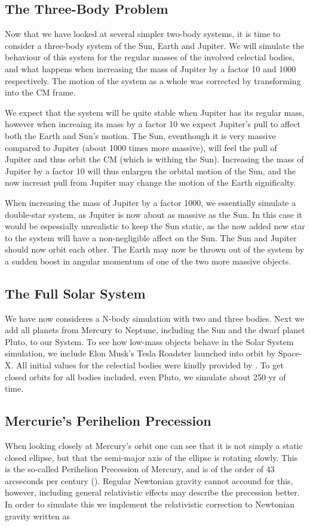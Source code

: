 \documentclass[twocolumn]{aastex62}
\begin{document}
\subsection{The Three-Body Problem} \label{subsec:three_body_prob}
Now that we have looked at several simpler two-body systems, it is time to
consider a three-body system of the Sun, Earth and Jupiter. We will simulate the
behaviour of this system for the regular masses of the involved celectial
bodies, and what happens when increasing the mass of Jupiter by a factor 10 and
1000 respectively. The motion of the system as a whole was corrected by
transforming into the CM frame.

We expect that the system will be quite stable when Jupiter has its regular
mass, however when increaing its mass by a factor 10 we expect Jupiter's pull to
affect both the Earth and Sun's motion. The Sun, eventhough it is very massive
compared to Jupiter (about 1000 times more massive), will feel the pull of
Jupiter and thus orbit the CM (which is withing the Sun). Increasing the mass of
Jupiter by a factor 10 will thus enlargen the orbital motion of the Sun, and the
now increast pull from Jupiter may change the motion of the Earth significalty. 

When increasing the mass of Jupiter by a factor 1000, we essentially simulate a
double-star system, as Jupiter is now about as massive as the Sun. In this case
it would be espessially unrealistic to keep the Sun static, as the now added new
star to the system will have a non-negligible affect on the Sun. The Sun and
Jupiter should now orbit each other. The Earth may now be thrown out of the
system by a sudden boost in angular momentum of one of the two more massive
objects. 


\subsection{The Full Solar System} \label{subsec:solar_system}
We have now consideres a N-body simulation with two and three bodies. Next we
add all planets from Mercury to Neptune, including the Sun and the dwarf planet
Pluto, to our System. To see how low-mass objects behave in the Solar System
simulation, we include Elon Musk's Tesla Roadster launched into orbit by
Space-X. All initial values for the celectial bodies were kindly provided by
\cite{nasa:2018}.
To get closed orbits for all bodies included, even Pluto, we simulate
about 250 yr of time.

\subsection{Mercurie's Perihelion Precession}
When looking closely at Mercury's orbit one can see that it is not simply a
static closed ellipse, but that the semi-major axis of the ellipse is rotating
slowly. This is the so-called Perihelion Precession of Mercury, and is of the
order of 43 arcseconds per century (\cite{jensen:2019}). Regular Newtonian gravity cannot accound for
this, however, including general relativistic effects may describe the
precession better. In order to simulate this we implement the
relativistic correction to Newtonian gravity written as 
\end{document}
